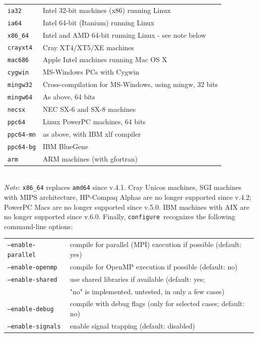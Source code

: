 \documentclass[12pt,a4paper]{article}
\def\configure{\texttt{configure}}
\begin{document}
\begin{tabular}{ll}
\texttt{ia32}&    Intel 32-bit machines (x86) running Linux\\
\texttt{ia64}&    Intel 64-bit (Itanium) running Linux\\
\texttt{x86\_64}&  Intel and AMD 64-bit running Linux - see note below\\
\texttt{crayxt4}& Cray XT4/XT5/XE machines\\
\texttt{mac686}&  Apple Intel machines running Mac OS X\\
\texttt{cygwin}&  MS-Windows PCs with Cygwin\\
\texttt{mingw32}& Cross-compilation for MS-Windows, using mingw, 32 bits\\
\texttt{mingw64}& As above, 64 bits\\
\texttt{necsx}&   NEC SX-6 and SX-8 machines\\
\texttt{ppc64}&   Linux PowerPC machines, 64 bits\\
\texttt{ppc64-mn}&as above, with IBM xlf compiler\\
\texttt{ppc64-bg}&IBM BlueGene\\
\texttt{arm}     &ARM machines (with gfortran)
\end{tabular}\\
{\em Note}: \texttt{x86\_64} replaces \texttt{amd64} since v.4.1.
Cray Unicos machines, SGI
machines with MIPS architecture, HP-Compaq Alphas are no longer supported
since v.4.2; PowerPC Macs are no longer
supported since v.5.0. IBM machines with AIX are no longer supported
since v.6.0.
Finally, \configure\ recognizes the following command-line options:\\
\begin{tabular}{ll}
\texttt{--enable-parallel}&     compile for parallel (MPI) execution if possible (default: yes)\\
\texttt{--enable-openmp}&       compile for OpenMP execution if possible (default: no)\\
\texttt{--enable-shared}&       use shared libraries if available (default: yes;\\
                        &       "no" is implemented, untested, in only a few cases)\\
\texttt{--enable-debug}&        compile with debug flags (only for selected cases; default: no)\\
\texttt{--enable-signals}&      enable signal trapping (default: disabled)\\
\end{tabular}\\
\end{document}
